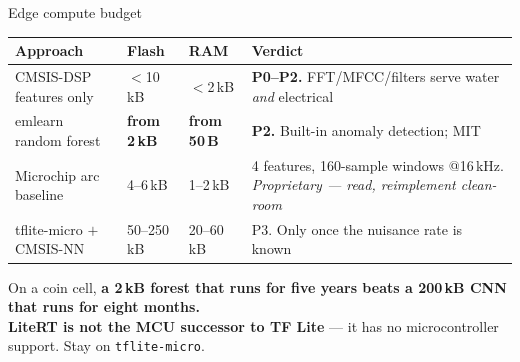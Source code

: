 \documentclass[aspectratio=169,t,10pt,xcolor={table,svgnames}]{beamer}
\newcommand{\hd}[1]{\textbf{\footnotesize #1}}
\begin{document}
\begin{frame}{Edge compute budget}
  \scriptsize
  \begin{tabular}{@{}p{}p{}p{}p{}@{}}
    \toprule
    \hd{Approach} & \hd{Flash} & \hd{RAM} & \hd{Verdict} \\
    \midrule
    CMSIS-DSP features only      & $<$10\,kB & $<$2\,kB & \cellcolor{fill1}\textbf{P0--P2.} FFT/MFCC/filters serve water \emph{and} electrical \\
    emlearn random forest        & \textbf{from 2\,kB} & \textbf{from 50\,B} & \cellcolor{fill1}\textbf{P2.} Built-in anomaly detection; MIT \\
    Microchip arc baseline       & 4--6\,kB & 1--2\,kB & 4 features, 160-sample windows @16\,kHz. \emph{Proprietary --- read, reimplement clean-room} \\
    tflite-micro $+$ CMSIS-NN    & 50--250\,kB & 20--60\,kB & P3. Only once the nuisance rate is known \\
    \bottomrule
  \end{tabular}
  \vspace{0.7em}
  \begin{beamercolorbox}[wd=\textwidth,sep=1.6ex]{}
    \color{ink}\small On a coin cell, \textbf{a 2\,kB forest that runs for five years beats a 200\,kB
    CNN that runs for eight months.}\\
    \textbf{LiteRT is not the MCU successor to TF Lite} --- it has no microcontroller support. Stay on
    \texttt{tflite-micro}.
  \end{beamercolorbox}
\end{frame}
\end{document}
